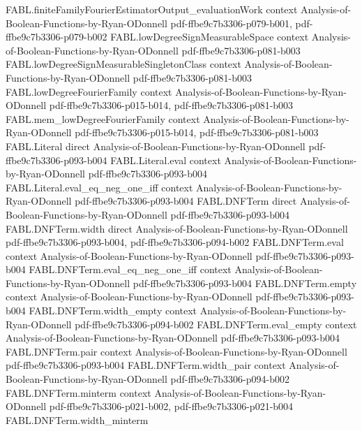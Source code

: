\begin{theorem}
  {FABL.finiteFamilyFourierEstimatorOutput_evaluationWork}
  {context}
  {Analysis-of-Boolean-Functions-by-Ryan-ODonnell}
  {pdf-ffbe9c7b3306-p079-b001,
    pdf-ffbe9c7b3306-p079-b002}
\proofstep
  {FABL.lowDegreeSignMeasurableSpace}
  {context}
  {Analysis-of-Boolean-Functions-by-Ryan-ODonnell}
  {pdf-ffbe9c7b3306-p081-b003}
\proofstep
  {FABL.lowDegreeSignMeasurableSingletonClass}
  {context}
  {Analysis-of-Boolean-Functions-by-Ryan-ODonnell}
  {pdf-ffbe9c7b3306-p081-b003}
\proofstep
  {FABL.lowDegreeFourierFamily}
  {context}
  {Analysis-of-Boolean-Functions-by-Ryan-ODonnell}
  {pdf-ffbe9c7b3306-p015-b014,
    pdf-ffbe9c7b3306-p081-b003}
\proofstep
  {FABL.mem_lowDegreeFourierFamily}
  {context}
  {Analysis-of-Boolean-Functions-by-Ryan-ODonnell}
  {pdf-ffbe9c7b3306-p015-b014,
    pdf-ffbe9c7b3306-p081-b003}
\proofstep
  {FABL.Literal}
  {direct}
  {Analysis-of-Boolean-Functions-by-Ryan-ODonnell}
  {pdf-ffbe9c7b3306-p093-b004}
\proofstep
  {FABL.Literal.eval}
  {context}
  {Analysis-of-Boolean-Functions-by-Ryan-ODonnell}
  {pdf-ffbe9c7b3306-p093-b004}
\proofstep
  {FABL.Literal.eval_eq_neg_one_iff}
  {context}
  {Analysis-of-Boolean-Functions-by-Ryan-ODonnell}
  {pdf-ffbe9c7b3306-p093-b004}
\proofstep
  {FABL.DNFTerm}
  {direct}
  {Analysis-of-Boolean-Functions-by-Ryan-ODonnell}
  {pdf-ffbe9c7b3306-p093-b004}
\proofstep
  {FABL.DNFTerm.width}
  {direct}
  {Analysis-of-Boolean-Functions-by-Ryan-ODonnell}
  {pdf-ffbe9c7b3306-p093-b004,
    pdf-ffbe9c7b3306-p094-b002}
\proofstep
  {FABL.DNFTerm.eval}
  {context}
  {Analysis-of-Boolean-Functions-by-Ryan-ODonnell}
  {pdf-ffbe9c7b3306-p093-b004}
\proofstep
  {FABL.DNFTerm.eval_eq_neg_one_iff}
  {context}
  {Analysis-of-Boolean-Functions-by-Ryan-ODonnell}
  {pdf-ffbe9c7b3306-p093-b004}
\proofstep
  {FABL.DNFTerm.empty}
  {context}
  {Analysis-of-Boolean-Functions-by-Ryan-ODonnell}
  {pdf-ffbe9c7b3306-p093-b004}
\proofstep
  {FABL.DNFTerm.width_empty}
  {context}
  {Analysis-of-Boolean-Functions-by-Ryan-ODonnell}
  {pdf-ffbe9c7b3306-p094-b002}
\proofstep
  {FABL.DNFTerm.eval_empty}
  {context}
  {Analysis-of-Boolean-Functions-by-Ryan-ODonnell}
  {pdf-ffbe9c7b3306-p093-b004}
\proofstep
  {FABL.DNFTerm.pair}
  {context}
  {Analysis-of-Boolean-Functions-by-Ryan-ODonnell}
  {pdf-ffbe9c7b3306-p093-b004}
\proofstep
  {FABL.DNFTerm.width_pair}
  {context}
  {Analysis-of-Boolean-Functions-by-Ryan-ODonnell}
  {pdf-ffbe9c7b3306-p094-b002}
\proofstep
  {FABL.DNFTerm.minterm}
  {context}
  {Analysis-of-Boolean-Functions-by-Ryan-ODonnell}
  {pdf-ffbe9c7b3306-p021-b002,
    pdf-ffbe9c7b3306-p021-b004}
\proofstep
  {FABL.DNFTerm.width_minterm}

\end{theorem}

